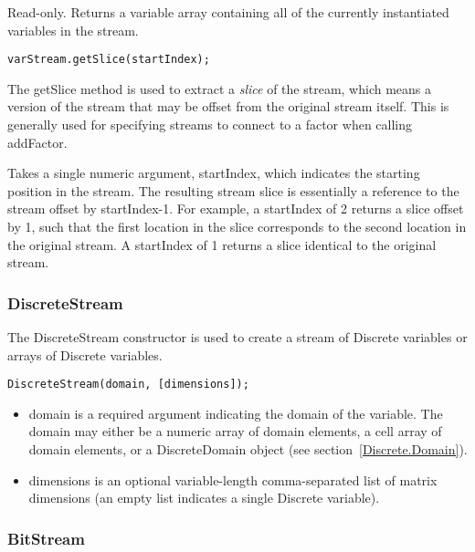 
Read-only.  Returns a variable array containing all of the currently instantiated variables in the stream.



\label{sec:VariableStream.getSlice}

\begin{lstlisting}
varStream.getSlice(startIndex);
\end{lstlisting}

The getSlice method is used to extract a \emph{slice} of the stream, which means a version of the stream that may be offset from the original stream itself.  This is generally used for specifying streams to connect to a factor when calling addFactor.

Takes a single numeric argument, startIndex, which indicates the starting position in the stream.  The resulting stream slice is essentially a reference to the stream offset by startIndex-1.  For example, a startIndex of 2 returns a slice offset by 1, such that the first location in the slice corresponds to the second location in the original stream.  A startIndex of 1 returns a slice identical to the original stream.


\subsubsection{DiscreteStream}

\label{DiscreteStream.Constructor}

The DiscreteStream constructor is used to create a stream of Discrete variables or arrays of Discrete variables.

\begin{lstlisting}
DiscreteStream(domain, [dimensions]);
\end{lstlisting}

\begin{itemize}
\item domain is a required argument indicating the domain of the variable.  The domain may either be a numeric array of domain elements, a cell array of domain elements, or a DiscreteDomain object (see section~\ref{Discrete.Domain}).
\item dimensions is an optional variable-length comma-separated list of matrix dimensions (an empty list indicates a single Discrete variable).
\end{itemize}

\subsubsection{BitStream}

